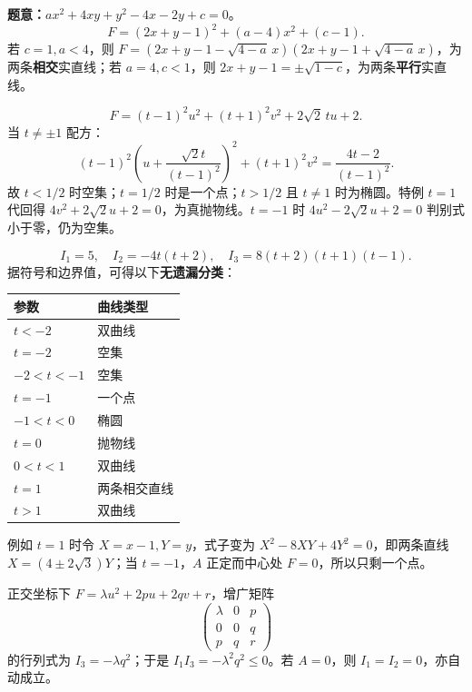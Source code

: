 \textbf{题意：}$ax^2+4xy+y^2-4x-2y+c=0$。
\[
\boxed{F=(2x+y-1)^2+(a-4)x^2+(c-1).}
\]
若 $c=1,a<4$，则 $F=(2x+y-1-\sqrt{4-a}\,x)(2x+y-1+\sqrt{4-a}\,x)$，为两条\textbf{相交}实直线；若 $a=4,c<1$，则 $2x+y-1=\pm\sqrt{1-c}$，为两条\textbf{平行}实直线。

\par
{}
\[
F=(t-1)^2u^2+(t+1)^2v^2+2\sqrt2\,tu+2.
\]
当 $t\ne\pm1$ 配方：
\[
(t-1)^2\left(u+\frac{\sqrt2t}{(t-1)^2}\right)^2+(t+1)^2v^2
=\frac{4t-2}{(t-1)^2}.
\]
故 $t<1/2$ 时空集；$t=1/2$ 时是一个点；$t>1/2$ 且 $t\ne1$ 时为椭圆。特例 $t=1$ 代回得 $4v^2+2\sqrt2u+2=0$，为真抛物线。$t=-1$ 时 $4u^2-2\sqrt2u+2=0$ 判别式小于零，仍为空集。
\par
{}
\[
I_1=5,\quad I_2=-4t(t+2),\quad I_3=8(t+2)(t+1)(t-1).
\]
据符号和边界值，可得以下\textbf{无遗漏分类}：
\begin{center}\small
\begin{tabular}{@{}ll@{}}\toprule
参数 & 曲线类型\\
\midrule
$t<-2$ & 双曲线 \\
$t=-2$ & 空集\\
$-2<t<-1$ & 空集\\
$t=-1$ & 一个点\\
$-1<t<0$ & 椭圆\\
$t=0$ & 抛物线\\
$0<t<1$ & 双曲线\\
$t=1$ & 两条相交直线\\
$t>1$ & 双曲线\\\bottomrule
\end{tabular}
\end{center}
例如 $t=1$ 时令 $X=x-1,Y=y$，式子变为 $X^2-8XY+4Y^2=0$，即两条直线 $X=(4\pm2\sqrt3)Y$；当 $t=-1$，$A$ 正定而中心处 $F=0$，所以只剩一个点。

正交坐标下 $F=\lambda u^2+2p u+2q v+r$，增广矩阵
\[
\begin{pmatrix}\lambda&0&p\\0&0&q\\p&q&r\end{pmatrix}
\]
的行列式为 $I_3=-\lambda q^2$；于是 $I_1I_3=-\lambda^2q^2\le0$。若 $A=0$，则 $I_1=I_2=0$，亦自动成立。

